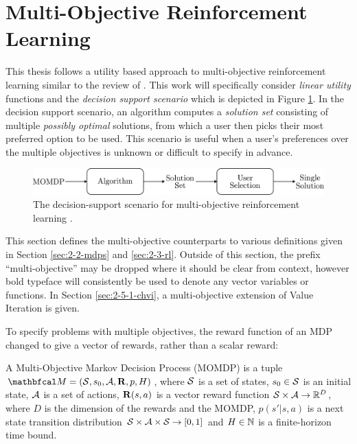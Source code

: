 \section{Multi-Objective Reinforcement Learning}
\label{sec:2-5-morl}

    This thesis follows a utility based approach to multi-objective reinforcement learning similar to the review of \citet{morl_survey}. This work will specifically consider \textit{linear utility} functions and the \textit{decision support scenario} which is depicted in Figure \ref{fig:2:mo_decision_support}. In the decision support scenario, an algorithm computes a \textit{solution set} consisting of multiple \textit{possibly optimal} solutions, from which a user then picks their most preferred option to be used. This scenario is useful when a user's preferences over the multiple objectives is unknown or difficult to specify in advance. 

    \begin{figure}
        \centering\includegraphics[width=1.0\textwidth]{figures/ch2/decision_support_scenario.pdf} 
        \caption{The decision-support scenario for multi-objective reinforcement learning \cite{morl_survey}.}
        \label{fig:2:mo_decision_support}
    \end{figure}

    This section defines the multi-objective counterparts to various definitions given in Section \ref{sec:2-2-mdps} and \ref{sec:2-3-rl}. Outside of this section, the prefix ``multi-objective'' may be dropped where it should be clear from context, however bold typeface will consistently be used to denote any vector variables or functions. In Section \ref{sec:2-5-1-chvi}, a multi-objective extension of Value Iteration is given.

    To specify problems with multiple objectives, the reward function of an MDP changed to give a vector of rewards, rather than a scalar reward:
    \begin{defn}
        \label{def:2:mo_mdp}
        A \textnormal{Multi-Objective Markov Decision Process} (MOMDP) is a tuple $\bfcl{M}=(\cl{S},s_0,\cl{A},\bff{R},p,H)$, where $\mathcal{S}$ is a set of states, $s_0\in\mathcal{S}$ is an initial state, $\mathcal{A}$ is a set of actions, $\mathbf{R}(s,a)$ is a vector reward function $\mathcal{S}\times \mathcal{A}\rightarrow \mathbb{R}^D$, where $D$ is the dimension of the rewards and the MOMDP, $p(s' | s,a)$ is a next state transition distribution $\mathcal{S} \times \mathcal{A} \times \mathcal{S} \rightarrow [0,1]$ and $H\in\mathbb{N}$ is a finite-horizon time bound.
    \end{defn}

